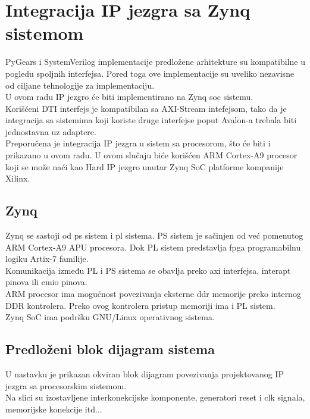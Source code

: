 \section{Integracija IP jezgra sa Zynq sistemom}

PyGears i SystemVerilog implementacije predložene arhitekture su kompatibilne u
pogledu spoljnih interfejsa.
Pored toga ove implementacije su uveliko nezavisne od ciljane tehnologije za
implementaciju. \\
U ovom radu IP jezgro će biti implementirano na Zynq \gls{soc} sistemu. \\

Korišćeni DTI interfejs je kompatibilan sa AXI-Stream intefejsom, tako da je
integracija sa sistemima koji koriste druge interfejse poput Avalon-a trebala
biti jednostavna uz adaptere. \\

Preporučena je integracija IP jezgra u sistem sa procesorom, što će biti i
prikazano u ovom radu.
U ovom slučaju biće korišćen ARM Cortex-A9 procesor koji se može naći kao Hard
IP jezgro unutar Zynq SoC platforme kompanije Xilinx. \\

\subsection{Zynq}

Zynq se sastoji od \gls{ps} sistem i \gls{pl} sistema.
PS sistem je sačinjen od već pomenutog ARM Cortex-A9 \gls{APU} procesora.
Dok PL sistem predstavlja \gls{fpga} programabilnu logiku Artix-7 familije. \\

Komunikacija između PL i PS sistema se obavlja preko \gls{axi} interfejsa,
interapt pinova ili \gls{emio} pinova.\\

ARM procesor ima mogućnost povezivanja eksterne \gls{ddr} memorije preko
internog DDR kontrolera.
Preko ovog kontrolera pristup memoriji ima i PL sistem. \\
Zynq SoC ima podršku GNU/Linux operativnog sistema.

\newpage

\subsection{Predloženi blok dijagram sistema}

U nastavku je prikazan okviran blok dijagram povezivanja projektovanog IP jezgra
sa procesorskim sistemom. \\
Na slici su izostavljene interkonekcijske komponente, generatori reset i clk signala,
memorijske konekcije itd... \\

